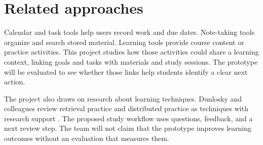 \section{Related approaches}

Calendar and task tools help users record work and due dates. Note-taking tools organize and search stored material. Learning tools provide course content or practice activities. This project studies how those activities could share a learning context, linking goals and tasks with materials and study sessions. The prototype will be evaluated to see whether those links help students identify a clear next action.

The project also draws on research about learning techniques. Dunlosky and colleagues review retrieval practice and distributed practice as techniques with research support \cite{dunlosky2013}. The proposed study workflow uses questions, feedback, and a next review step. The team will not claim that the prototype improves learning outcomes without an evaluation that measures them.
